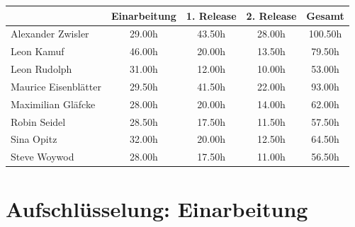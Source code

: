 \documentclass[11pt,a4paper]{report}
\begin{document}
	\begin{center}
		\begin{tabular}{|l|c|c|c|c|}
		\hline
		& Einarbeitung & 1. Release & 2. Release & Gesamt\\
		\hline
		Alexander Zwisler		&      29.00h	     &      43.50h        &      28.00h        &	100.50h	\\
		\hline     
		Leon Kamuf				&      46.00h        &      20.00h        &      13.50h        &	79.50h	\\
		\hline		
		Leon Rudolph			&      31.00h        &      12.00h        &      10.00h        &	53.00h	\\
		\hline
		Maurice Eisenblätter	&      29.50h        &      41.50h        &      22.00h        &	93.00h	\\
		\hline
		Maximilian Gläfcke		&      28.00h        &      20.00h        &      14.00h        &	62.00h	\\
		\hline
		Robin Seidel			&      28.50h        &      17.50h        &      11.50h        &	57.50h	\\
		\hline
		Sina Opitz				&      32.00h        &      20.00h        &      12.50h        &	64.50h	\\
		\hline
		Steve Woywod			&      28.00h        &      17.50h        &      11.00h        &	56.50h	\\
		\hline
		\end{tabular}
 	\end{center}

\section{Aufschlüsselung: Einarbeitung}

\end{document}

